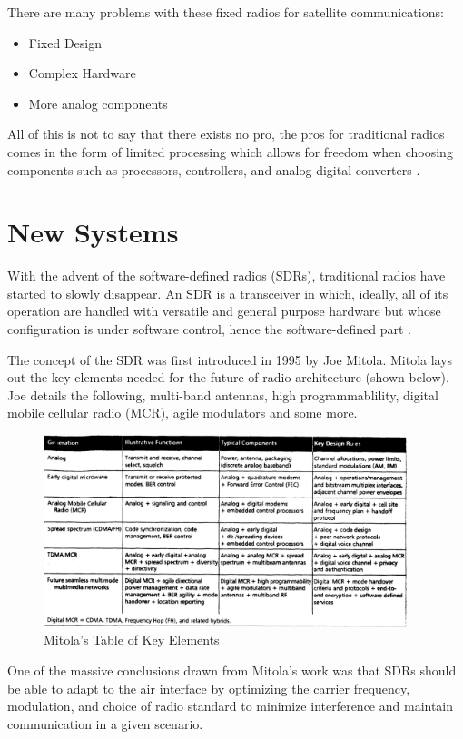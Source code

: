 \documentclass[../main.tex]{subfiles}
\begin{document}
There are many problems with these fixed radios for satellite communications:
\begin{itemize}
    \item Fixed Design
    \item Complex Hardware
    \item More analog components
\end{itemize}
All of this is not to say that there exists no pro, the pros for traditional radios comes in the form of limited processing which allows for freedom when choosing components such as processors, controllers, and analog-digital converters \cite{sdr_satellite}.


\section{New Systems}
With the advent of the software-defined radios (SDRs), traditional radios have started to slowly disappear. An SDR is a transceiver in which, ideally, all of its operation are handled with versatile and general purpose hardware but whose configuration is under software control, hence the software-defined part \cite{sdr_satellite}.

The concept of the SDR was first introduced in 1995 by Joe Mitola. Mitola lays out the key elements needed for the future of radio architecture (shown below). Joe details the following, multi-band antennas, high programmablility, digital mobile cellular radio (MCR), agile modulators and some more.

\begin{figure}[H]
    \centering
    \includegraphics[width=300pt]{images/elements_sdr.PNG}
    \caption{Mitola's Table of Key Elements \cite{sdr_archi}}
    \label{fig:key_elements}
\end{figure}

One of the massive conclusions drawn from Mitola's work was that SDRs should be able to adapt to the air interface by optimizing the carrier frequency, modulation, and choice of radio standard to minimize interference and maintain communication in a given scenario.
\end{document}
